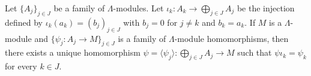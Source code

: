 Let $\{A_j\}_{j \in J}$ be a family of $\Lambda$-modules. Let $\iota_k : A_k \to \bigoplus_{j \in J} A_j$ be the injection defined by $\iota_k(a_k) = (b_j)_{j \in J}$ with $b_j = 0$ for $j \neq k$ and $b_k = a_k$. If $M$ is a $\Lambda$-module and $\{\psi_j : A_j \to M\}_{j \in J}$ is a family of $\Lambda$-module homomorphisms, then there exists a unique homomorphism $\psi = \langle \psi_j \rangle : \bigoplus_{j \in J} A_j \to M$ such that $\psi \iota_k = \psi_k$ for every $k \in J$.
